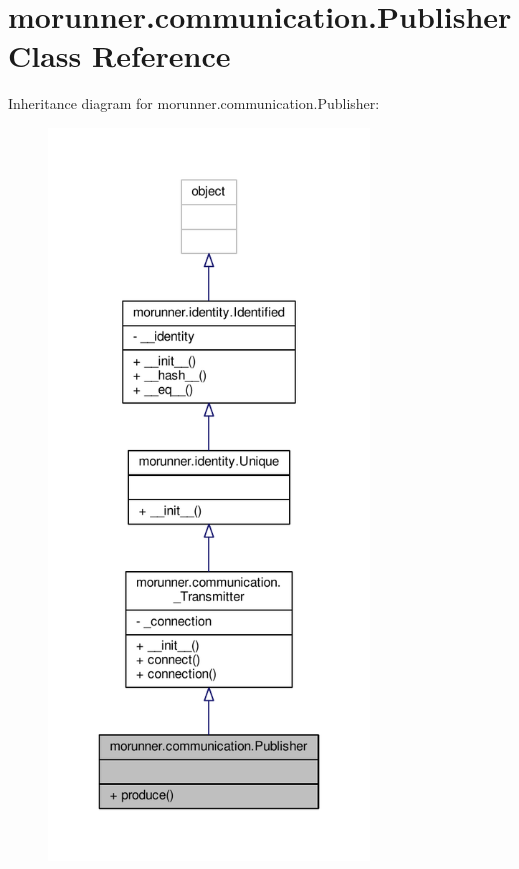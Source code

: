 \hypertarget{classmorunner_1_1communication_1_1Publisher}{}\section{morunner.\+communication.\+Publisher Class Reference}
\label{classmorunner_1_1communication_1_1Publisher}


Inheritance diagram for morunner.\+communication.\+Publisher\+:
\nopagebreak
\begin{figure}[H]
\begin{center}
\leavevmode
\includegraphics[height=550pt]{classmorunner_1_1communication_1_1Publisher__inherit__graph}
\end{center}
\end{figure}


